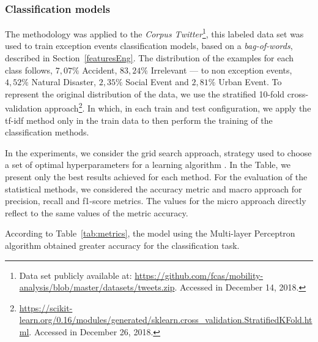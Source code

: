 \documentclass[runningheads]{llncs}
\begin{document}
\subsubsection{Classification models}


\label{Experiments_Corpus_Twitter}
The methodology was applied to the \textit{Corpus Twitter}\footnote{Data set publicly available at: \url{https://github.com/fcas/mobility-analysis/blob/master/datasets/tweets.zip}. Accessed in December 14, 2018.}, this labeled data set was used to train exception events classification models, based on a \textit{bag-of-words}, described in Section~\ref{featuresEng}. %
The distribution of the examples for each class follows, $7,07\%$ Accident, $83,24\%$ Irrelevant --- to non exception events, $4,52\%$ Natural Disaster, $2,35\%$ Social Event and $2,81\%$ Urban Event. To represent the original distribution of the data, we use the stratified 10-fold cross-validation approach\footnote{\url{https://scikit-learn.org/0.16/modules/generated/sklearn.cross_validation.StratifiedKFold.html}. Accessed in December 26, 2018.}. In which, in each train and test configuration, we apply the tf-idf method only in the train data to then perform the training of the classification methods.

In the experiments, we consider the grid search approach, strategy used to choose a set of optimal hyperparameters for a learning algorithm \cite{james2013introduction}. In the Table, we present only the best results achieved for each method. For the evaluation of the statistical methods, we considered the accuracy metric and macro approach for precision, recall and f1-score metrics. The values for the micro approach directly reflect to the same values of the metric accuracy.





 According to Table~\ref{tab:metrics}, the model using the Multi-layer Perceptron algorithm obtained greater accuracy for the classification task. 

\end{document}

